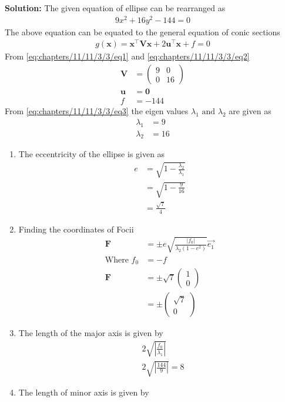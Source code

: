 \documentclass[12pt]{article}
\providecommand{\brak}[1]{\ensuremath{\left(#1\right)}}
\providecommand{\abs}[1]{\left\vert#1\right\vert}
\newcommand{\solution}{\noindent \textbf{Solution: }}
\newcommand{\myvec}[1]{\ensuremath{\begin{pmatrix}#1\end{pmatrix}}}
\let\vec\mathbf
\begin{document}
\begin{enumerate}
\solution
\fi
The given equation of ellipse can be rearranged as 
\begin{align}
 9x^2+16y^2-144=0\label{eq:chapters/11/11/3/3/eq1}
\end{align}
The above equation can be equated to the general equation of conic sections
\begin{align}
 g\brak{\vec{x}}=\vec{x}^\top \vec{V} \vec{x} + 2\vec{u}^\top \vec{x} + f = 0\label{eq:chapters/11/11/3/3/eq2}
\end{align}
From \eqref{eq:chapters/11/11/3/3/eq1} and \eqref{eq:chapters/11/11/3/3/eq2}
\begin{align}
 \vec{V} &= \myvec{9&0\\0&16}\label{eq:chapters/11/11/3/3/eq3}\\
 \vec{u} &= \vec{0}\\
 f &= -144
\end{align}
From \eqref{eq:chapters/11/11/3/3/eq3} the eigen values $\lambda_1 \text{ and } \lambda_2$ are given as
\begin{align}
 \lambda_1 &= 9\\
 \lambda_2 &= 16
\end{align}
\begin{enumerate}
\item The eccentricity of the ellipse is given as
\begin{align}
 e &= \sqrt{1 - \frac{\lambda_2}{\lambda_1}} \\
          &= \sqrt{1-\frac{9}{16}}\\
   &= \frac{\sqrt{7}}{4}
\end{align}
\item Finding the coordinates of Focii
\begin{align}
 \vec{F} &= \pm e\sqrt{\frac{\abs{f_0}}{\lambda_2\brak{1-e^2}}}\Vec{e_1}\\
\text{Where }f_0 &=-f\\
 \vec{F} &= \pm\sqrt{7}\myvec{1\\0}\\
	&= \pm\myvec{\sqrt{7}\\0}
\end{align}
\item The length of the major axis is given by
\begin{align}
 &2\sqrt{\abs{\frac{f_0}{\lambda_1}}}\\
        &2\sqrt{\abs{\frac{144}{9}}}= 8
\end{align}
\item The length of minor axis is given by
\begin{align}

\end{align}
\end{enumerate}
\end{enumerate}
\end{document}
